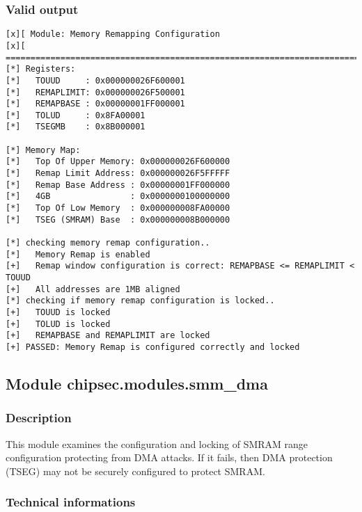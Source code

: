 \hypertarget{valid-output-10}{%
\subsubsection{Valid output}\label{valid-output-10}}

\begin{verbatim}
[x][ Module: Memory Remapping Configuration
[x][ =======================================================================
[*] Registers:
[*]   TOUUD     : 0x000000026F600001
[*]   REMAPLIMIT: 0x000000026F500001
[*]   REMAPBASE : 0x00000001FF000001
[*]   TOLUD     : 0x8FA00001
[*]   TSEGMB    : 0x8B000001

[*] Memory Map:
[*]   Top Of Upper Memory: 0x000000026F600000
[*]   Remap Limit Address: 0x000000026F5FFFFF
[*]   Remap Base Address : 0x00000001FF000000
[*]   4GB                : 0x0000000100000000
[*]   Top Of Low Memory  : 0x000000008FA00000
[*]   TSEG (SMRAM) Base  : 0x000000008B000000

[*] checking memory remap configuration..
[*]   Memory Remap is enabled
[+]   Remap window configuration is correct: REMAPBASE <= REMAPLIMIT < TOUUD
[+]   All addresses are 1MB aligned
[*] checking if memory remap configuration is locked..
[+]   TOUUD is locked
[+]   TOLUD is locked
[+]   REMAPBASE and REMAPLIMIT are locked
[+] PASSED: Memory Remap is configured correctly and locked
\end{verbatim}

\hypertarget{module-chipsec.modules.smm_dma}{%
\subsection{Module
chipsec.modules.smm\_dma}\label{module-chipsec.modules.smm_dma}}

\hypertarget{description-11}{%
\subsubsection{Description}\label{description-11}}

This module examines the configuration and locking of SMRAM range
configuration protecting from DMA attacks. If it fails, then DMA
protection (TSEG) may not be securely configured to protect SMRAM.

\hypertarget{technical-informations-10}{%
\subsubsection{Technical informations}\label{technical-informations-10}}

